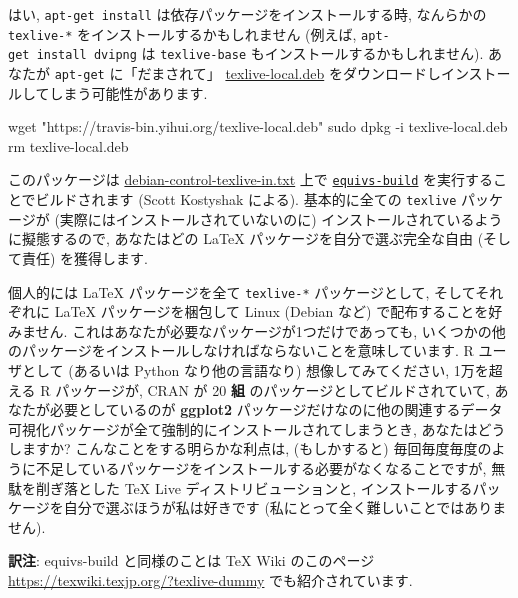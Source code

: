 \documentclass[
  xelatex,ja=standard,jafont=noto]{bxjsreport}
\newenvironment{Shaded}{\begin{snugshade}}{\end{snugshade}}
\newcommand{\AttributeTok}[1]{\textcolor[rgb]{0.77,0.63,0.00}{#1}}
\newcommand{\FunctionTok}[1]{\textcolor[rgb]{0.00,0.00,0.00}{#1}}
\newcommand{\NormalTok}[1]{#1}
\newcommand{\StringTok}[1]{\textcolor[rgb]{0.31,0.60,0.02}{#1}}
\begin{document}
はい, \texttt{apt-get\ install} は依存パッケージをインストールする時,
なんらかの \texttt{texlive-*} をインストールするかもしれません (例えば,
\texttt{apt-get\ install\ dvipng} は \texttt{texlive-base}
もインストールするかもしれません). あなたが \texttt{apt-get}
に「だまされて」
\href{https://travis-bin.yihui.org/texlive-local.deb}{texlive-local.deb}
をダウンロードしインストールしてしまう可能性があります.

\begin{Shaded}
\begin{Highlighting}[]
\FunctionTok{wget} \StringTok{"https://travis{-}bin.yihui.org/texlive{-}local.deb"}
\FunctionTok{sudo}\NormalTok{ dpkg }\AttributeTok{{-}i}\NormalTok{ texlive{-}local.deb}
\FunctionTok{rm}\NormalTok{ texlive{-}local.deb}
\end{Highlighting}
\end{Shaded}

このパッケージは
\href{https://github.com/scottkosty/install-tl-ubuntu/blob/master/debian-control-texlive-in.txt}{debian-control-texlive-in.txt}
上で
\href{http://manpages.ubuntu.com/manpages/trusty/man1/equivs-build.1.html}{\texttt{equivs-build}}
を実行することでビルドされます (Scott Kostyshak による). 基本的に全ての
\texttt{texlive} パッケージが (実際にはインストールされていないのに)
インストールされているように擬態するので, あなたはどの LaTeX
パッケージを自分で選ぶ完全な自由 (そして責任) を獲得します.

個人的には LaTeX パッケージを全て \texttt{texlive-*} パッケージとして,
そしてそれぞれに LaTeX パッケージを梱包して Linux (Debian など)
で配布することを好みません.
これはあなたが必要なパッケージが1つだけであっても,
いくつかの他のパッケージをインストールしなければならないことを意味しています.
R ユーザとして (あるいは Python なり他の言語なり) 想像してみてください,
1万を超える R パッケージが, CRAN が 20 \textbf{組}
のパッケージとしてビルドされていて, あなたが必要としているのが
\textbf{ggplot2}
パッケージだけなのに他の関連するデータ可視化パッケージが全て強制的にインストールされてしまうとき,
あなたはどうしますか? こんなことをする明らかな利点は, (もしかすると)
毎回毎度毎度のように不足しているパッケージをインストールする必要がなくなることですが,
無駄を削ぎ落とした TeX Live ディストリビューションと,
インストールするパッケージを自分で選ぶほうが私は好きです
(私にとって全く難しいことではありません).

\textbf{訳注}: equivs-build と同様のことは TeX Wiki のこのページ
\url{https://texwiki.texjp.org/?texlive-dummy} でも紹介されています.
\end{document}
